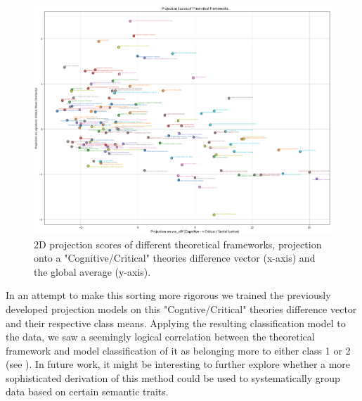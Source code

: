 \begin{figure}%
    \centering
    \includegraphics[width=1\linewidth]{media/theoretical_frameworks_socio_cognitive.png}
    \caption{2D projection scores of different theoretical frameworks, projection onto a "Cognitive/Critical" theories difference vector (x-axis) and the global average (y-axis).}
    \label{fig:109}
\end{figure}


In an attempt to make this sorting more rigorous we trained the previously developed projection models on this "Cogntive/Critical" theories difference vector and their respective class means. Applying the resulting classification model to the data, we saw a seemingly logical correlation between the theoretical framework and model classification of it as belonging more to either class 1 or 2 (see ). In future work, it might be interesting to further explore whether a more sophisticated derivation of this method could be used to systematically group data based on certain semantic traits.

